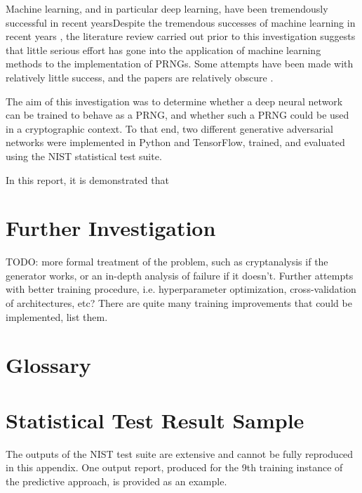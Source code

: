\documentclass[12pt, titlepage]{report}
\theoremstyle{definition}
\begin{document}
Machine learning, and in particular deep learning, have been tremendously successful in recent yearsDespite the tremendous successes of machine learning in recent years \cite[p. 24-29]{russel2009artificial}, the literature review carried out prior to this investigation suggests that little serious effort has gone into the application of machine learning methods to the implementation of PRNGs. Some attempts have been made with relatively little success, and the papers are relatively obscure \cite{desai2011pseudo} \cite{desai2012pseudo} \cite{tirdad2010hopfield}.

The aim of this investigation was to determine whether a deep neural network can be trained to behave as a PRNG, and whether such a PRNG could be used in a cryptographic context. To that end, two different generative adversarial networks were implemented in Python and TensorFlow, trained, and evaluated using the NIST statistical test suite.

In this report, it is demonstrated that 






\chapter{Further Investigation}
TODO: more formal treatment of the problem, such as cryptanalysis if the generator works, or an in-depth analysis of failure if it doesn't. Further attempts with better training procedure, i.e. hyperparameter optimization, cross-validation of architectures, etc? There are quite many training improvements that could be implemented, list them.










\appendix
\chapter{Glossary}



\chapter{Statistical Test Result Sample}
The outputs of the NIST test suite are extensive and cannot be fully reproduced in this appendix. One output report, produced for the 9th training instance of the predictive approach, is provided as an example.
\end{document}
